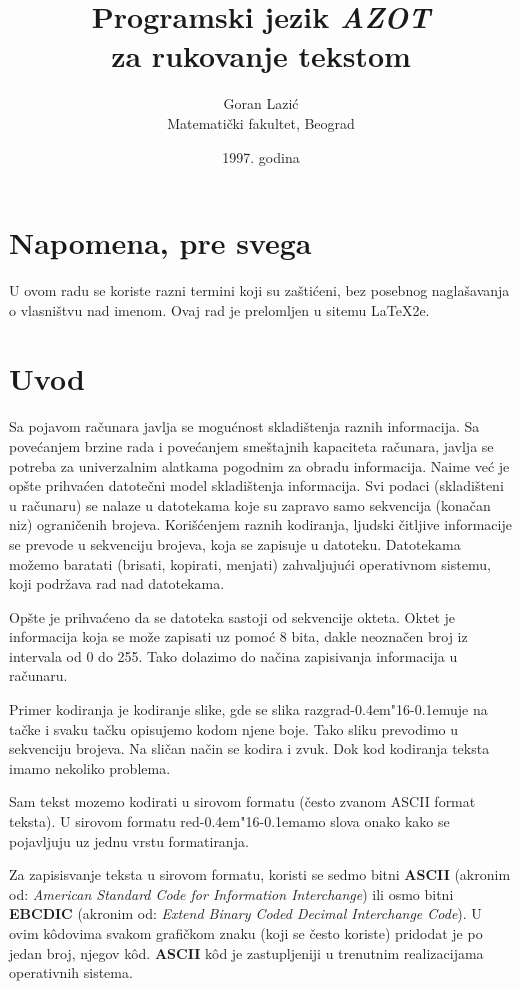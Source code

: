\documentclass[12pt,a4paper,titlepage]{article}
\title{\bf Programski jezik {\em AZOT}\\za rukovanje tekstom}
\author{Goran Lazi\'c\\Matemati\v cki fakultet, Beograd}
\date{1997. godina}
\def\d{d\kern-0.4em\char"16\kern-0.1em}
\begin{document}
  \maketitle
  \tableofcontents
%
%
  \section*{Napomena, pre svega}
    U ovom radu se koriste razni termini koji su za\v sti\'ceni, bez posebnog
    nagla\v savanja o vlasni\v stvu nad imenom.
    Ovaj rad je prelomljen u sitemu \LaTeX2e.
%
%
  \newpage
  \section{Uvod}
    Sa pojavom ra\v cunara javlja se mogu\'cnost skladi\v stenja raznih
    informacija.
    Sa pove\'canjem brzine rada i pove\'canjem sme\v stajnih kapaciteta
    ra\v cunara, javlja se potreba za univerzalnim alatkama pogodnim za obradu
    informacija.
    Naime ve\'c je op\v ste prihva\'cen datote\v cni model skladi\v stenja
    informacija.
    Svi podaci (skladi\v steni u ra\v cunaru) se nalaze u datotekama koje su
    zapravo samo sekvencija (kona\v can niz) ograni\v cenih brojeva.
    Kori\v s\'cenjem raznih kodiranja, ljudski \v citljive informacije se
    prevode u sekvenciju brojeva, koja se zapisuje u datoteku.
    Datotekama mo\v zemo baratati (brisati, kopirati, menjati) zahvaljuju\'ci
    operativnom sistemu, koji podr\v zava rad nad datotekama.

    Op\v ste je prihva\'ceno da se datoteka sastoji od sekvencije okteta.
    Oktet je informacija koja se mo\v ze zapisati uz pomo\'c 8 bita, dakle
    neozna\v cen broj iz intervala od 0 do 255.
    Tako dolazimo do na\v cina zapisivanja informacija u ra\v cunaru.

    Primer kodiranja je kodiranje slike, gde se slika razgra\d uje na ta\v cke
    i svaku ta\v cku opisujemo kodom njene boje. Tako sliku prevodimo u
    sekvenciju brojeva. Na sli\v can na\v cin se kodira i zvuk. Dok kod
    kodiranja teksta imamo nekoliko problema.

    Sam tekst mozemo kodirati u sirovom formatu (\v cesto zvanom ASCII format
    teksta). U sirovom formatu re\d amo slova onako kako se pojavljuju uz
    jednu vrstu formatiranja.

    Za zapisisvanje teksta u sirovom formatu, koristi se sedmo bitni {\bf
    ASCII} (akronim od: {\em American Standard Code for Information
    Interchange}) ili osmo bitni {\bf EBCDIC} (akronim od: {\em Extend Binary
    Coded Decimal Interchange Code}).
    U ovim k\^odovima svakom grafi\v ckom znaku (koji se \v cesto koriste)
    pridodat je po jedan broj, njegov k\^od.
    {\bf ASCII} k\^od je zastupljeniji u trenutnim realizacijama operativnih
    sistema.
\end{document}
